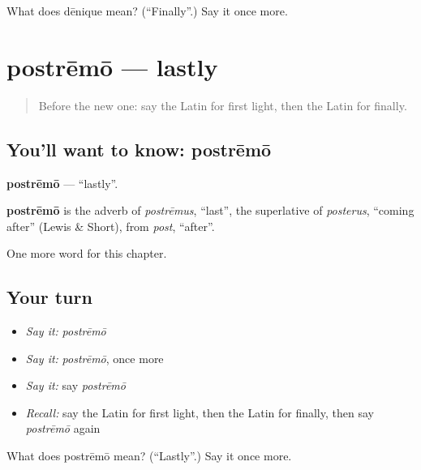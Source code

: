 \begin{tcolorbox}[breakable,colback=teal!4,colframe=teal!35!black,title={Before you move on}]
What does dēnique mean? (\textquotedblleft{}Finally\textquotedblright{}.) Say it once more.
\end{tcolorbox}
\section[postrēmō]{postrēmō — lastly}

\label{lesson:LA-C208-postremo}



\begin{quote}
Before the new one: say the Latin for first light, then the Latin for finally.
\end{quote}

\subsection*{You'll want to know: postrēmō}
\textbf{postrēmō} — \textquotedblleft{}lastly\textquotedblright{}.

\begin{cousinweb}
\textbf{postrēmō} is the adverb of \emph{postrēmus}, \textquotedblleft{}last\textquotedblright{}, the superlative of \emph{posterus}, \textquotedblleft{}coming after\textquotedblright{} (Lewis \& Short), from \emph{post}, \textquotedblleft{}after\textquotedblright{}.
\end{cousinweb}

\begin{grammarlens}[title={What you've built}]
One more word for this chapter.
\end{grammarlens}

\subsection*{Your turn}
\begin{itemize}
\raggedright
  \item \emph{Say it:} \emph{postrēmō}
  \item \emph{Say it:} \emph{postrēmō}, once more
  \item \emph{Say it:} say \emph{postrēmō}
  \item \emph{Recall:} say the Latin for first light, then the Latin for finally, then say \emph{postrēmō} again
\end{itemize}

\begin{tcolorbox}[breakable,colback=teal!4,colframe=teal!35!black,title={Before you move on}]
What does postrēmō mean? (\textquotedblleft{}Lastly\textquotedblright{}.) Say it once more.
\end{tcolorbox}
